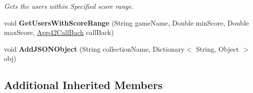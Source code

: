 \begin{DoxyCompactItemize}
\begin{DoxyCompactList}\small\item\em Gets the users within Specified score range. \end{DoxyCompactList}\item 
\hypertarget{classcom_1_1shephertz_1_1app42_1_1paas_1_1sdk_1_1csharp_1_1game_1_1_score_board_service_a3a2d82465f23b562528ff570a4e3eea2}{void {\bfseries Get\+Users\+With\+Score\+Range} (String game\+Name, Double min\+Score, Double max\+Score, \hyperlink{interfacecom_1_1shephertz_1_1app42_1_1paas_1_1sdk_1_1csharp_1_1_app42_call_back}{App42\+Call\+Back} call\+Back)}\label{classcom_1_1shephertz_1_1app42_1_1paas_1_1sdk_1_1csharp_1_1game_1_1_score_board_service_a3a2d82465f23b562528ff570a4e3eea2}

\item 
\hypertarget{classcom_1_1shephertz_1_1app42_1_1paas_1_1sdk_1_1csharp_1_1game_1_1_score_board_service_a290faa79959c5cdc5f92cc6158177ba8}{void {\bfseries Add\+J\+S\+O\+N\+Object} (String collection\+Name, Dictionary$<$ String, Object $>$ obj)}\label{classcom_1_1shephertz_1_1app42_1_1paas_1_1sdk_1_1csharp_1_1game_1_1_score_board_service_a290faa79959c5cdc5f92cc6158177ba8}

\end{DoxyCompactItemize}
\subsection*{Additional Inherited Members}


